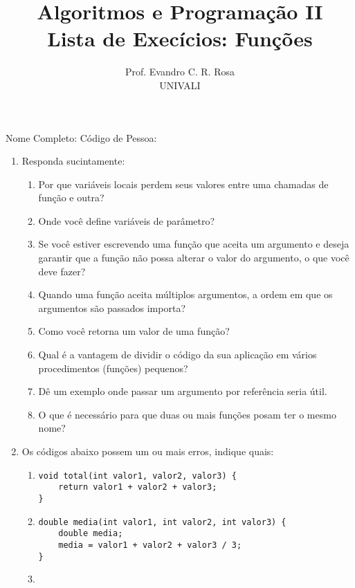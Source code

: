 \documentclass[12pt]{article}
\title{Algoritmos e Programação II\\
\large Lista de Execícios: Funções}
\author{Prof. Evandro C. R. Rosa\\UNIVALI}
\date{}
\begin{document}
\maketitle

\noindent Nome Completo: \underline{\hspace{8.4cm}} Código de Pessoa: \underline{\hspace{2.4cm}}

\begin{enumerate}
    \item Responda sucintamente:
          \begin{enumerate}
              \item Por que variáveis locais perdem seus valores entre uma chamadas de função e outra?
              \item Onde você define variáveis de parâmetro?
              \item Se você estiver escrevendo uma função que aceita um argumento e deseja garantir que a função não possa alterar o valor do argumento, o que você deve fazer?
              \item Quando uma função aceita múltiplos argumentos, a ordem em que os argumentos são passados importa?
              \item Como você retorna um valor de uma função?
              \item Qual é a vantagem de dividir o código da sua aplicação em vários procedimentos (funções) pequenos?
              \item Dê um exemplo onde passar um argumento por referência seria útil.
              \item O que é necessário para que duas ou mais funções posam ter o mesmo nome?
          \end{enumerate}
    \item Os códigos abaixo possem um ou mais erros, indique quais:
          \begin{enumerate}
              \item \begin{verbatim}
void total(int valor1, valor2, valor3) {
    return valor1 + valor2 + valor3;
}
        \end{verbatim}
              \item \begin{verbatim}
double media(int valor1, int valor2, int valor3) {
    double media;
    media = valor1 + valor2 + valor3 / 3;
}
        \end{verbatim}
              \item \begin{verbatim}

\end{verbatim}
\end{enumerate}
\end{enumerate}
\end{document}
